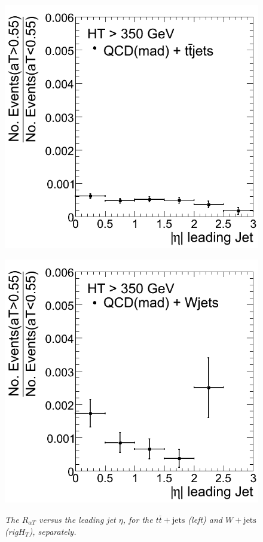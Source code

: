 \begin{figure}[h!]
\begin{minipage}[b]{0.5\linewidth}
\centering
{\label{fig:m$H_{T}$ov$H_{T}$}\includegraphics[scale=0.38]{./plots/RaT-TTbarVsQCD.png}} 
\end{minipage}
\begin{minipage}[b]{0.5\linewidth}
\centering
{\label{fig:$H_{T}$}\includegraphics[scale=0.38]{./plots/RaT-WVsQCD.png}} 
\end{minipage}
\caption{\textit{The $R_{\alpha T}$ versus the leading jet $\eta$, for the $t\bar{t} + \textrm{jets}$ (left) and $W + \textrm{jets}$ (rig$H_{T}$), separately.} }
\label{fig:bkgsep}
\end{figure}

